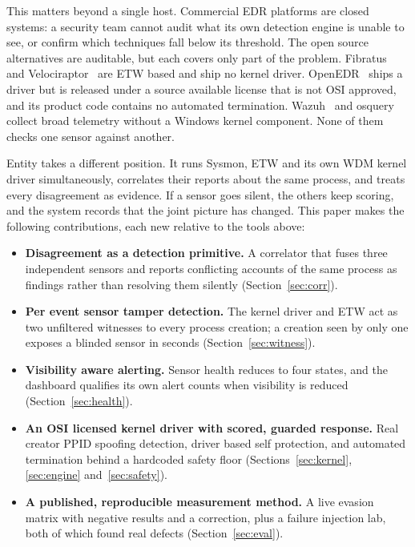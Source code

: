 \documentclass[10pt,twocolumn,letterpaper]{article}
\begin{document}
This matters beyond a single host. Commercial EDR platforms are closed systems: a
security team cannot audit what its own detection engine is unable to see, or confirm
which techniques fall below its threshold. The open source alternatives are auditable,
but each covers only part of the problem. Fibratus~\cite{fibratus} and
Velociraptor~\cite{velociraptor} are ETW based and ship no kernel driver.
OpenEDR~\cite{openedr} ships a driver but is released under a source available license
that is not OSI approved, and its product code contains no automated termination.
Wazuh~\cite{wazuh} and osquery~\cite{osquery} collect broad telemetry without a Windows
kernel component. None of them checks one sensor against another.

Entity takes a different position. It runs Sysmon, ETW and its own WDM kernel driver
simultaneously, correlates their reports about the same process, and treats every
disagreement as evidence. If a sensor goes silent, the others keep scoring, and the
system records that the joint picture has changed. This paper makes the following
contributions, each new relative to the tools above:

\begin{itemize}
  \item \textbf{Disagreement as a detection primitive.} A correlator that fuses three
    independent sensors and reports conflicting accounts of the same process as findings
    rather than resolving them silently (Section~\ref{sec:corr}).
  \item \textbf{Per event sensor tamper detection.} The kernel driver and ETW act as two
    unfiltered witnesses to every process creation; a creation seen by only one exposes
    a blinded sensor in seconds (Section~\ref{sec:witness}).
  \item \textbf{Visibility aware alerting.} Sensor health reduces to four states, and
    the dashboard qualifies its own alert counts when visibility is reduced
    (Section~\ref{sec:health}).
  \item \textbf{An OSI licensed kernel driver with scored, guarded response.} Real
    creator PPID spoofing detection, driver based self protection, and automated
    termination behind a hardcoded safety floor (Sections~\ref{sec:kernel},
    \ref{sec:engine} and~\ref{sec:safety}).
  \item \textbf{A published, reproducible measurement method.} A live evasion matrix
    with negative results and a correction, plus a failure injection lab, both of which
    found real defects (Section~\ref{sec:eval}).
\end{itemize}
\end{document}
